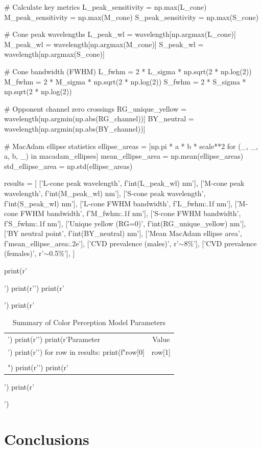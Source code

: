 \documentclass[11pt,a4paper]{article}
\begin{document}
\begin{pycode}
# Calculate key metrics
L_peak_sensitivity = np.max(L_cone)
M_peak_sensitivity = np.max(M_cone)
S_peak_sensitivity = np.max(S_cone)

# Cone peak wavelengths
L_peak_wl = wavelength[np.argmax(L_cone)]
M_peak_wl = wavelength[np.argmax(M_cone)]
S_peak_wl = wavelength[np.argmax(S_cone)]

# Cone bandwidth (FWHM)
L_fwhm = 2 * L_sigma * np.sqrt(2 * np.log(2))
M_fwhm = 2 * M_sigma * np.sqrt(2 * np.log(2))
S_fwhm = 2 * S_sigma * np.sqrt(2 * np.log(2))

# Opponent channel zero crossings
RG_unique_yellow = wavelength[np.argmin(np.abs(RG_channel))]
BY_neutral = wavelength[np.argmin(np.abs(BY_channel))]

# MacAdam ellipse statistics
ellipse_areas = [np.pi * a * b * scale**2 for (_, _, a, b, _) in macadam_ellipses]
mean_ellipse_area = np.mean(ellipse_areas)
std_ellipse_area = np.std(ellipse_areas)

results = [
    ['L-cone peak wavelength', f'{int(L_peak_wl)} nm'],
    ['M-cone peak wavelength', f'{int(M_peak_wl)} nm'],
    ['S-cone peak wavelength', f'{int(S_peak_wl)} nm'],
    ['L-cone FWHM bandwidth', f'{L_fwhm:.1f} nm'],
    ['M-cone FWHM bandwidth', f'{M_fwhm:.1f} nm'],
    ['S-cone FWHM bandwidth', f'{S_fwhm:.1f} nm'],
    ['Unique yellow (RG=0)', f'{int(RG_unique_yellow)} nm'],
    ['BY neutral point', f'{int(BY_neutral)} nm'],
    ['Mean MacAdam ellipse area', f'{mean_ellipse_area:.2e}'],
    ['CVD prevalence (males)', r'$\sim$8\%'],
    ['CVD prevalence (females)', r'$\sim$0.5\%'],
]

print(r'\begin{table}[H]')
print(r'\centering')
print(r'\caption{Summary of Color Perception Model Parameters}')
print(r'\begin{tabular}{@{}lc@{}}')
print(r'\toprule')
print(r'Parameter & Value \\')
print(r'\midrule')
for row in results:
    print(f"{row[0]} & {row[1]} \\\\")
print(r'\bottomrule')
print(r'\end{tabular}')
print(r'\end{table}')
\end{pycode}

\section{Conclusions}
\end{document}
